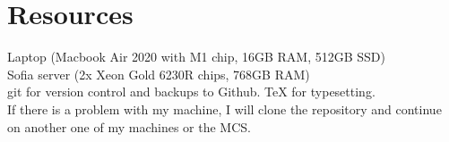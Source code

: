 \documentclass[../main]{subfiles}
\begin{document}
\section*{Resources}
Laptop (Macbook Air 2020 with M1 chip, 16GB RAM, 512GB SSD)\\
Sofia server (2x Xeon Gold 6230R chips, 768GB RAM)\\
git for version control and backups to Github. TeX for typesetting.\\
If there is a problem with my machine, I will clone the repository and continue on another one of my machines or the MCS.

% 
% 
\end{document}
